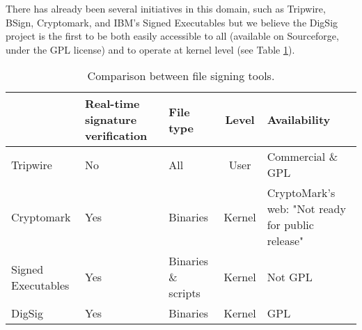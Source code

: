 \documentclass{article}
\begin{document}
There has already been several initiatives in this domain,
such as Tripwire, BSign, Cryptomark, and IBM's Signed Executables \cite{Tripwire, Bsign, Cryptomark, IBM-sign}
but we believe the DigSig project is the first to be both 
easily accessible to all (available on Sourceforge, 
under the GPL license) and to operate at kernel level (see Table \ref{tab:userspace}).

\begin{table}[ht]
\begin{center}
\begin{tabular}{|p{1.8cm}|p{1.6cm}|p{1.4cm}|c|p{3cm}|}
\hline
 & Real-time signature verification & File type & Level & Availability \\ 
\hline
Tripwire    & No           & All       & User      & Commercial  \& GPL \\ 
\hline
Cryptomark  & Yes          & Binaries  & Kernel    & CryptoMark's web: "Not ready for public release" \\
\hline
Signed  Executables    & Yes          & Binaries \& scripts & Kernel    & Not GPL   \\     
\hline
DigSig      & Yes          & Binaries  & Kernel    & GPL \\ 
\hline
\end{tabular}
\caption{Comparison between file signing tools.}
\label{tab:userspace}
\end{center}
\end{table}

\end{document}
